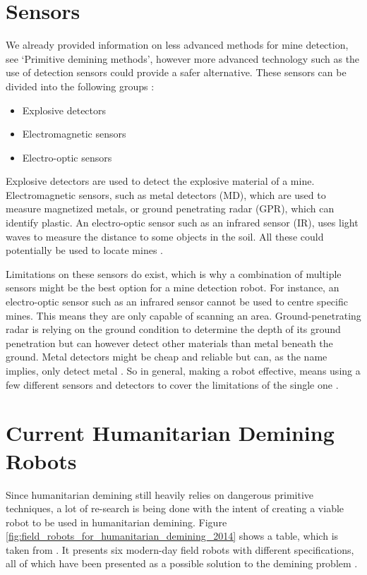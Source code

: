 \section{Sensors}

We already provided information on less advanced methods for mine detection, see ‘Primitive demining methods’, however more advanced technology such as the use of detection sensors could provide a safer alternative. These sensors can be divided into the following groups \cite{HumanitarianDemining2017}:
\begin{itemize}
\setlength{\itemsep}{0.05\baselineskip}
	\item Explosive detectors
	\item Electromagnetic sensors
	\item Electro-optic sensors
\end{itemize}

Explosive detectors are used to detect the explosive material of a mine. Electromagnetic sensors, such as metal detectors (MD), which are used to measure magnetized metals, or ground penetrating radar (GPR), which can identify plastic. An electro-optic sensor such as an infrared sensor (IR), uses light waves to measure the distance to some objects in the soil. All these could potentially be used to locate mines \cite{HumanitarianDemining2017}.

Limitations on these sensors do exist, which is why a combination of multiple sensors might be the best option for a mine detection robot. For instance, an electro-optic sensor such as an infrared sensor cannot be used to centre specific mines. This means they are only capable of scanning an area. Ground-penetrating radar is relying on the ground condition to determine the depth of its ground penetration but can however detect other materials than metal beneath the ground. Metal detectors might be cheap and reliable but can, as the name implies, only detect metal \cite{HumanitarianDemining2017}.
So in general, making a robot effective, means using a few different sensors and detectors to cover the limitations of the single one \cite{6LeggedRobot2007}.

\section{Current Humanitarian Demining Robots}

Since humanitarian demining still heavily relies on dangerous primitive techniques, a lot of re-search is being done with the intent of creating a viable robot to be used in humanitarian demining. Figure \ref{fig:field_robots_for_humanitarian_demining_2014} shows a table, which is taken from \cite{FieldRobots2014}. It presents six modern-day field robots with different specifications, all of which have been presented as a possible solution to the demining problem \cite{FieldRobots2014}.

